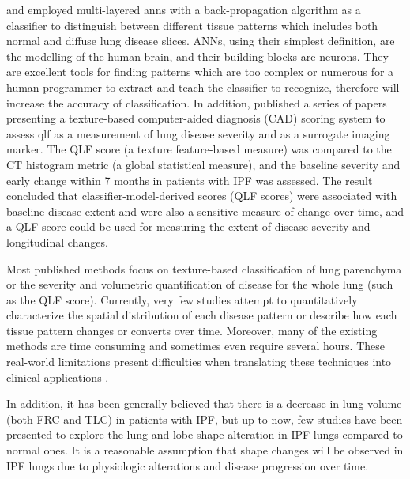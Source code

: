 \cite{uchiyama2003quantitative} and \cite{kim2005computer} employed multi-layered \gls{anns} with a back-propagation algorithm as a classifier to distinguish between different tissue patterns which includes both normal and diffuse lung disease slices. ANNs, using their simplest definition, are the modelling of the human brain, and their building blocks are neurons. They are excellent tools for finding patterns which are too complex or numerous for a human programmer to extract and teach the classifier to recognize, therefore will increase the accuracy of classification. In addition, \cite{kim2010computer,kim2011quantitative,kim2015comparison} published a series of papers presenting a texture-based computer-aided diagnosis (CAD) scoring system to assess \gls{qlf} as a measurement of lung disease severity and as a surrogate imaging marker. The QLF score (a texture feature-based measure) was compared to the CT histogram metric (a global statistical measure), and the baseline severity and early change within 7 months in patients with IPF was assessed. The result concluded that classifier-model-derived scores (QLF scores) were associated with baseline disease extent and were also a sensitive measure of change over time, and a QLF score could be used for measuring the extent of disease severity and longitudinal changes.

Most published methods focus on texture-based classification of lung parenchyma or the severity and volumetric quantification of disease for the whole lung (such as the QLF score). Currently, very few studies attempt to quantitatively characterize the spatial distribution of each disease pattern or describe how each tissue pattern changes or converts over time. Moreover, many of the existing methods are time consuming and sometimes even require several hours. These real-world limitations present difficulties when translating these techniques into clinical applications \citep{bartholmai2013quantitative}.

In addition, it has been generally believed that there is a decrease in lung volume (both FRC and TLC) in patients with IPF, but up to now, few studies have been presented to explore the lung and lobe shape alteration in IPF lungs compared to normal ones. It is a reasonable assumption that shape changes will be observed in IPF lungs due to physiologic alterations and disease progression over time. 

